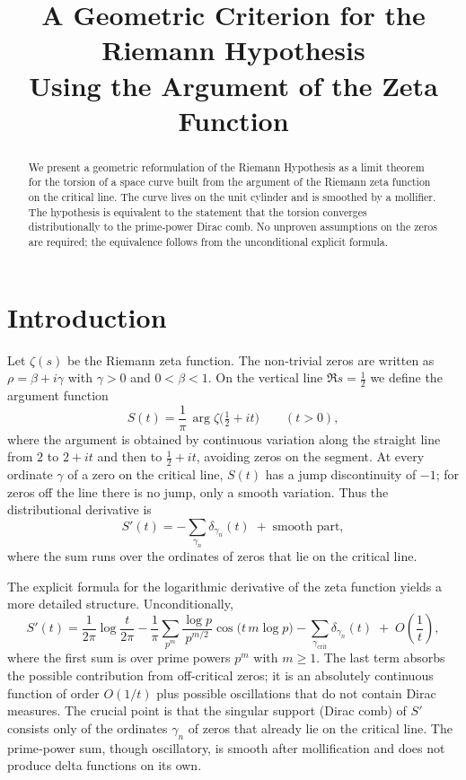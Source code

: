 \documentclass[12pt,a4paper]{article}
\title{\bf A Geometric Criterion for the Riemann Hypothesis\\ Using the Argument of the Zeta Function}
\author{}
\date{}
\begin{document}
\maketitle

\begin{abstract}
We present a geometric reformulation of the Riemann Hypothesis as a limit theorem for the
torsion of a space curve built from the argument of the Riemann zeta function on the critical
line.  The curve lives on the unit cylinder and is smoothed by a mollifier.  The hypothesis
is equivalent to the statement that the torsion converges distributionally to the
prime‑power Dirac comb.  No unproven assumptions on the zeros are required; the equivalence
follows from the unconditional explicit formula.
\end{abstract}

\section{Introduction}

Let \(\zeta(s)\) be the Riemann zeta function.  The non‑trivial zeros are written as
\(\rho = \beta + i\gamma\) with \(\gamma>0\) and \(0<\beta<1\).  On the vertical line
\(\Re s = \frac12\) we define the argument function
\[
S(t) = \frac{1}{\pi}\,\arg\zeta\!\bigl(\tfrac12+it\bigr)\qquad (t>0),
\]
where the argument is obtained by continuous variation along the straight line from
\(2\) to \(2+it\) and then to \(\frac12+it\), avoiding zeros on the segment.  At every
ordinate \(\gamma\) of a zero on the critical line, \(S(t)\) has a jump discontinuity of
\(-1\); for zeros off the line there is no jump, only a smooth variation.  Thus the
distributional derivative is
\[
S'(t) = -\sum_{\gamma_n} \delta_{\gamma_n}(t) \;+\; \text{smooth part},
\]
where the sum runs over the ordinates of zeros that lie on the critical line.

The explicit formula for the logarithmic derivative of the zeta function yields a more
detailed structure.  Unconditionally,
\[
S'(t) = \frac{1}{2\pi}\log\frac{t}{2\pi}
        - \frac{1}{\pi}\sum_{p^m}\frac{\log p}{p^{m/2}}\cos\bigl(t\,m\log p\bigr)
        - \sum_{\gamma_{\text{crit}}} \delta_{\gamma_n}(t) \;+\; O\!\left(\frac{1}{t}\right),
\]
where the first sum is over prime powers \(p^m\) with \(m\ge 1\).  The last term absorbs
the possible contribution from off‑critical zeros; it is an absolutely continuous
function of order \(O(1/t)\) plus possible oscillations that do not contain Dirac
measures.  The crucial point is that the singular support (Dirac comb) of \(S'\) consists
only of the ordinates \(\gamma_n\) of zeros that already lie on the critical line.  The
prime‑power sum, though oscillatory, is smooth after mollification and does not produce
delta functions on its own.
\end{document}
